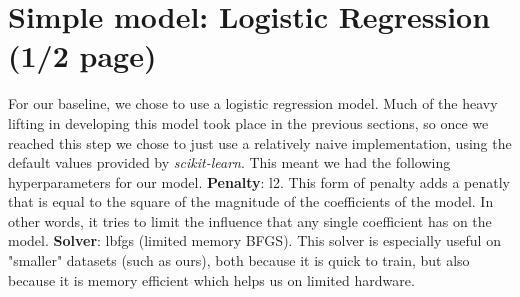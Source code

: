 \section{Simple model: Logistic Regression (1/2 page)} 
For our baseline, we chose to use a logistic regression model. Much of the heavy lifting in developing this model took place in the previous sections,
so once we reached this step we chose to just use a relatively naive implementation, using the default values provided
by \textit{scikit-learn}. This meant we had the following hyperparameters for our model. \textbf{Penalty}: l2. This form of penalty adds a penatly that is equal to the square of the magnitude of the
    coefficients of the model. In other words, it tries to limit the influence that any single coefficient has on the
    model. \textbf{Solver}: lbfgs (limited memory BFGS). This solver is especially useful on "smaller" datasets (such as
    ours), both because it is quick to train, but also because it is memory efficient which helps us on limited
    hardware.
